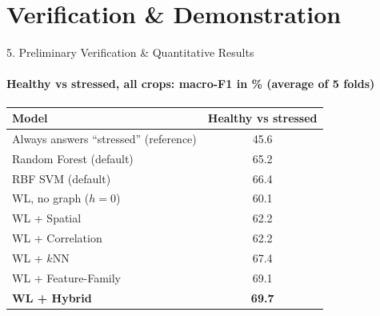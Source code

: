 \documentclass[aspectratio=169, 11pt]{beamer}
\begin{document}
\section{Verification \& Demonstration}

\begin{frame}{5. Preliminary Verification \& Quantitative Results}
    \framesubtitle{Healthy vs stressed, all crops: macro-F1 in \% (average of 5 folds)}
    \centering
    \small
    \renewcommand{\arraystretch}{1.1}
    \begin{tabular}{@{}l c@{}}
        \toprule
        \textbf{Model} & \textbf{Healthy vs stressed} \\
        \midrule
        Always answers ``stressed'' (reference) & 45.6 \\
        Random Forest \cite{breiman2001random} (default) & 65.2 \\
        RBF SVM (default) & 66.4 \\
        \midrule
        WL, no graph ($h=0$) & 60.1 \\
        WL + Spatial & 62.2 \\
        WL + Correlation & 62.2 \\
        WL + $k$NN & 67.4 \\
        WL + Feature-Family & 69.1 \\
        \textbf{WL + Hybrid} & \textbf{69.7} \\
        \bottomrule
    \end{tabular}
    \vspace{0.3cm}

\end{frame}
\end{document}
